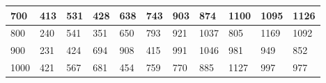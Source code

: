 \documentclass[10pt,letterpaper]{article}
\begin{document}
\begin{center}
\begin{table}
\begin{tabular} { |m{0.5cm}|m{1.3cm}|m{1.3cm}|m{1.3cm}|m{1.3cm}|m{1.3cm}|m{1.3cm}|m{1.3cm}|m{1.3cm}|m{1.3cm}|m{1.3cm}|}
\hline
\cellcolor{Gray}700 & \Large 413 & \Large 531 & \Large 428 & \Large 638 & \Large 743 & \Large 903 & \Large 874 & \Large 1100 & \Large 1095 & \Large 1126 \\
\hline
\cellcolor{Gray}800 & \Large 240 & \Large 541 & \Large 351 & \Large 650 & \Large 793 & \Large 921 & \Large 1037 & \Large 805 & \Large 1169 & \Large 1092 \\
\hline
\cellcolor{Gray}900 & \Large 231 & \Large 424 & \Large 694 & \Large 908 & \Large 415 & \Large 991 & \Large 1046 & \Large 981 & \Large 949 & \Large 852 \\
\hline
\cellcolor{Gray}1000 & \Large 421 & \Large 567 & \Large 681 & \Large 454 & \Large 759 & \Large 770 & \Large 885 & \Large 1127 & \Large 997 & \Large 977 \\
\hline
\end{tabular} \\
\end{table}
\end{center}
\newpage 
{}
\end{document}

